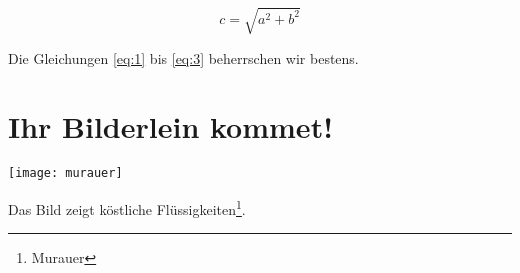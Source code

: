 \documentclass[11pt]{scrartcl}
\begin{document}
\begin{equation}
  \label{eq:3}
  c = \sqrt{a^{2} + b^{2}}
\end{equation}

Die Gleichungen \eqref{eq:1} bis \eqref{eq:3} beherrschen wir bestens.

\section{Ihr Bilderlein kommet!}
\label{sec:ihr-bild-komm}
\begin{center}
  \texttt{[image: murauer]}
\end{center}

Das Bild zeigt köstliche Flüssigkeiten\footnote{Murauer}.
\end{document}
